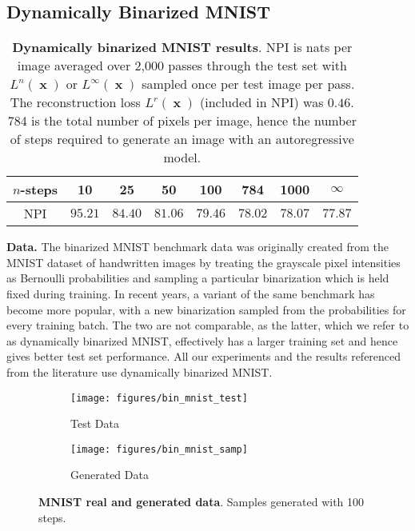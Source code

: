 \documentclass[11pt,table]{article}
\DeclareMathOperator{\x}{\mathbf{x}}
\newcommand{\0}[1]{\constvec{0}{#1}}
\newcommand{\1}[1]{\constvec{1}{#1}}
\begin{document}
\subsection{Dynamically Binarized MNIST}
\begin{table}[t!]
\centering
\begin{tabular}{cccccccc}
\toprule
$n$-steps & 10 & 25 & 50 & 100 & 784 & 1000 & $\infty$\\ 
\midrule
NPI & $95.21$ & $84.40$ & $81.06$ & $79.46$ & $78.02$ & $78.07$ & $77.87$ \\ 
\bottomrule
\end{tabular}
\caption{\textbf{Dynamically binarized MNIST results}. NPI is nats per image  averaged over 2,000 passes through the test set with $L^{n}(\x)$ or $L^{\infty}(\x)$ sampled once per test image per pass. The reconstruction loss $L^r(\x)$ (included in NPI) was $0.46$. 784 is the total number of pixels per image, hence the number of steps required to generate an image with an autoregressive model.}
\label{tab:mnist_results}
\end{table}

\textbf{Data.}\quad 
The binarized MNIST benchmark data was originally created from the MNIST dataset of handwritten images \citep{lecun-mnisthandwrittendigit-2010} by treating the grayscale pixel intensities as Bernoulli probabilities and sampling a particular binarization \citep{salakhutdinov2008quantitative} which is held fixed during training.
In recent years, a variant of the same benchmark has become more popular, with a new binarization sampled from the probabilities for every training batch.
The two are not comparable, as the latter, which we refer to as dynamically binarized MNIST, effectively has a larger training set and hence gives better test set performance.
All our experiments and the results referenced from the literature use dynamically binarized MNIST.
\\

\begin{figure}[t!]
\centering
\begin{subfigure}{.49\textwidth}
  \centering
  \texttt{[image: figures/bin\_mnist\_test]}
  \caption{Test Data}
\end{subfigure}
\begin{subfigure}{.49\textwidth}
  \centering
  \texttt{[image: figures/bin\_mnist\_samp]}
  \caption{Generated Data}
\end{subfigure}
\caption{\textbf{MNIST real and generated data}. Samples generated with 100 steps.}
\end{figure}
\end{document}

